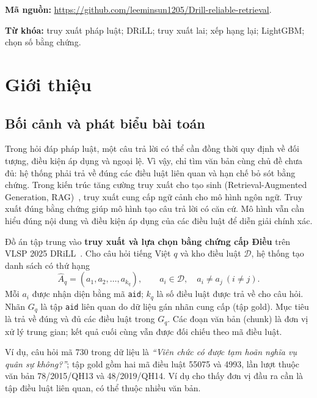 \documentclass[12pt,a4paper]{article}
\newcommand{\id}[1]{\texttt{#1}}
\begin{document}
\noindent\textbf{Mã nguồn:} \url{https://github.com/leeminsun1205/Drill-reliable-retrieval}.

\noindent\textbf{Từ khóa:} truy xuất pháp luật; DRiLL; truy xuất lai; xếp hạng lại; LightGBM; chọn số bằng chứng.
\vspace{4pt}
\begingroup\small\tableofcontents\endgroup
\clearpage
\section{Giới thiệu}\label{sec:intro}
\subsection{Bối cảnh và phát biểu bài toán}
Trong hỏi đáp pháp luật, một câu trả lời có thể cần đồng thời quy định về đối tượng, điều kiện áp dụng và ngoại lệ. Vì vậy, chỉ tìm văn bản cùng chủ đề chưa đủ: hệ thống phải trả về đúng các điều luật liên quan và hạn chế bỏ sót bằng chứng. Trong kiến trúc tăng cường truy xuất cho tạo sinh (Retrieval-Augmented Generation, RAG)~\cite{rag}, truy xuất cung cấp ngữ cảnh cho mô hình ngôn ngữ. Truy xuất đúng bằng chứng giúp mô hình tạo câu trả lời có căn cứ. Mô hình vẫn cần hiểu đúng nội dung và điều kiện áp dụng của các điều luật để diễn giải chính xác.

Đồ án tập trung vào \textbf{truy xuất và lựa chọn bằng chứng cấp Điều} trên VLSP 2025 DRiLL~\cite{drill}. Cho câu hỏi tiếng Việt $q$ và kho điều luật $\mathcal{D}$, hệ thống tạo danh sách có thứ hạng
\begin{equation}
\widehat{A}_q=(a_1,a_2,\ldots,a_{k_q}),\qquad a_i\in\mathcal{D},\quad a_i\ne a_j\ (i\ne j).
\label{eq:task}
\end{equation}
Mỗi $a_i$ được nhận diện bằng mã \id{aid}; $k_q$ là số điều luật được trả về cho câu hỏi. Nhãn $G_q$ là tập \id{aid} liên quan do dữ liệu gán nhãn cung cấp (tập gold). Mục tiêu là trả về đúng và đủ các điều luật trong $G_q$. Các đoạn văn bản (chunk) là đơn vị xử lý trung gian; kết quả cuối cùng vẫn được đối chiếu theo mã điều luật.

Ví dụ, câu hỏi mã 730 trong dữ liệu là \emph{``Viên chức có được tạm hoãn nghĩa vụ quân sự không?''}; tập gold gồm hai mã điều luật 55075 và 4993, lần lượt thuộc văn bản 78/2015/QH13 và 48/2019/QH14. Ví dụ cho thấy đơn vị đầu ra cần là tập điều luật liên quan, có thể thuộc nhiều văn bản.
\end{document}
